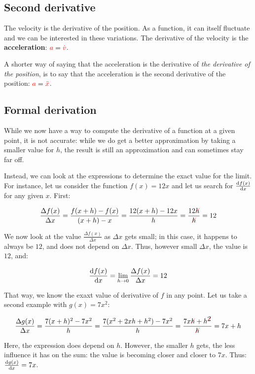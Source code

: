 \subsection{Second derivative}

The velocity is the derivative of the position. As a function, it can
itself fluctuate and we can be interested in these variations. The
derivative of the velocity is the \textbf{acceleration}: $\textcolor{red}{a} =
\textcolor{red}{\dot v}$.

A shorter way of saying that the acceleration is the derivative of
\textit{the derivative of the position}, is to say that the acceleration
is the second derivative of the position: $\textcolor{red}{a} = \textcolor{red}{\ddot x}$.


\subsection{Formal derivation}

While we now have a way to compute the derivative of a function at a
given point, it is not accurate: while we do get a better approximation
by taking a smaller value for $h$, the result is still an approximation
and can sometimes stay far off.

Instead, we can look at the expressions to determine the exact value
for the limit. For instance, let us consider the function $f(x) = 12x$
and let us search for $\frac {\mathrm{d} f(x)} {\mathrm{d} x}$ for any given $x$. First:

\[
\frac {\Delta f(x)} {\Delta x}
= \frac {f(x+h) - f(x)} {(x+h) - x}
= \frac {12(x+h) - 12x} {h}
= \frac {12\strike[red]{h}} {\strike[red]{h}}
= 12
\]

We now look at the value $\frac {\Delta f(x)} {\Delta x}$ as $\Delta x$
gets small; in this case, it happens to always be $12$, and does not
depend on $\Delta x$. Thus, however small $\Delta x$, the value is
$12$, and:

\[
\frac {\mathrm{d} f(x)} {\mathrm{d} x}
= \lim_{h \to 0} \frac {\Delta f(x)} {\Delta x}
= 12
\]

That way, we know the exaxt value of derivative of $f$ in any point. Let
us take a second example with $g(x) = 7x^2$:

\[
\frac {\Delta g(x)} {\Delta x}
= \frac {7(x+h)^2 - 7x^2} {h}
= \frac {7(x^2 + 2xh + h^2) - 7x^2} {h}
= \frac {7x\strike[red]{h} + h^{\strike[red]{2}}} {\strike[red]{h}}
= 7x + h
\]

Here, the expression does depend on $h$. However, the smaller $h$ gets,
the less influence it has on the sum: the value is becoming closer and
closer to $7x$. Thus: $\frac {\mathrm{d} g(x)} {\mathrm{d} x} = 7x$.


